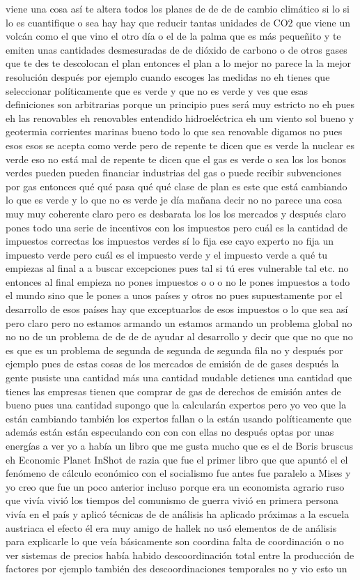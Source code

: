 viene una cosa así te altera todos los planes de de de de cambio climático si lo si lo es cuantifique o sea hay hay que reducir tantas unidades de CO2 que viene un volcán como el que vino el otro día o el de la palma que es más pequeñito y te emiten unas cantidades desmesuradas de de dióxido de carbono o de otros gases que te des te descolocan el plan entonces el plan a lo mejor no parece la la mejor resolución después por ejemplo cuando escoges las medidas no eh tienes que seleccionar políticamente que es verde y que no es verde y ves que esas definiciones son arbitrarias porque un principio pues será muy estricto no eh pues eh las renovables eh renovables entendido hidroeléctrica eh um viento sol bueno y geotermia corrientes marinas bueno todo lo que sea renovable digamos no pues esos esos se acepta como verde pero de repente te dicen que es verde la nuclear es verde eso no está mal de repente te dicen que el gas es verde o sea los los bonos verdes pueden pueden financiar industrias del gas o puede recibir subvenciones por gas entonces qué qué pasa qué qué clase de plan es este que está cambiando lo que es verde y lo que no es verde je día mañana decir no no parece una cosa muy muy coherente claro pero es desbarata los los los mercados y después claro pones todo una serie de incentivos con los impuestos pero cuál es la cantidad de impuestos correctas los impuestos verdes sí lo fija ese cayo experto no fija un impuesto verde pero cuál es el impuesto verde y el impuesto verde a qué tu empiezas al final a a buscar excepciones pues tal si tú eres vulnerable tal etc. no entonces al final empieza no pones impuestos o o o no le pones impuestos a todo el mundo sino que le pones a unos países y otros no pues supuestamente por el desarrollo de esos países hay que exceptuarlos de esos impuestos o lo que sea así pero claro pero no estamos armando un estamos armando un problema global no no no de un problema de de de de ayudar al desarrollo y decir que que no que no es que es un problema de segunda de segunda de segunda fila no y después por ejemplo pues de estas cosas de los mercados de emisión de de gases después la gente pusiste una cantidad más una cantidad mudable detienes una cantidad que tienes las empresas tienen que comprar de gas de derechos de emisión antes de bueno pues una cantidad supongo que la calcularán expertos pero yo veo que la están cambiando también los expertos fallan o la están usando políticamente que además están están especulando con con con ellas no después optas por unas energías a ver yo a había un libro que me gusta mucho que es el de Boris bruscus eh Economic Planet InShot de razia que fue el primer libro que que apuntó el el fenómeno de cálculo económico con el socialismo fue antes fue paralelo a Mises y yo creo que fue un poco anterior incluso porque era un economista agrario ruso que vivía vivió los tiempos del comunismo de guerra vivió en primera persona vivía en el país y aplicó técnicas de de análisis ha aplicado próximas a la escuela austriaca el efecto él era muy amigo de hallek no usó elementos de de análisis para explicarle lo que veía básicamente son coordina falta de coordinación o no ver sistemas de precios había habido descoordinación total entre la producción de factores por ejemplo también des descoordinaciones temporales no y vio esto un 